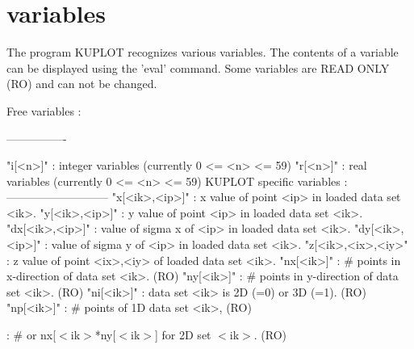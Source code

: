 \section{variables}
\par
The program KUPLOT recognizes various variables. The contents of a 
variable can be displayed using the 'eval' command. Some variables 
are READ ONLY (RO) and can not be changed. 
\par
\begin{MacVerbatim}
Free variables :
\end{MacVerbatim}
---------------- 
\par
\begin{MacVerbatim}
"i[<n>]"           : integer variables (currently 0 <= <n> <= 59)
"r[<n>]"           : real variables    (currently 0 <= <n> <= 59)
KUPLOT specific variables :
---------------------------
"x[<ik>,<ip>]"     : x value of point <ip> in loaded data set <ik>.
"y[<ik>,<ip>]"     : y value of point <ip> in loaded data set <ik>.
"dx[<ik>,<ip>]"    : value of sigma x of <ip> in loaded data set <ik>.
"dy[<ik>,<ip>]"    : value of sigma y of <ip> in loaded data set <ik>.
"z[<ik>,<ix>,<iy>" : z value of point <ix>,<iy> of loaded data set <ik>.
"nx[<ik>]"         : # points in x-direction of data set <ik>. (RO)
"ny[<ik>]"         : # points in y-direction of data set <ik>. (RO)
"ni[<ik>]"         : data set <ik> is 2D (=0) or 3D (=1).      (RO)
"np[<ik>]"         : # points of 1D data set <ik>,             (RO)
\end{MacVerbatim}
                   : \# or nx[$ <$ik$> $*ny[$ <$ik$> $] for 2D set $ <$ik$> $.    (RO) 
\par
